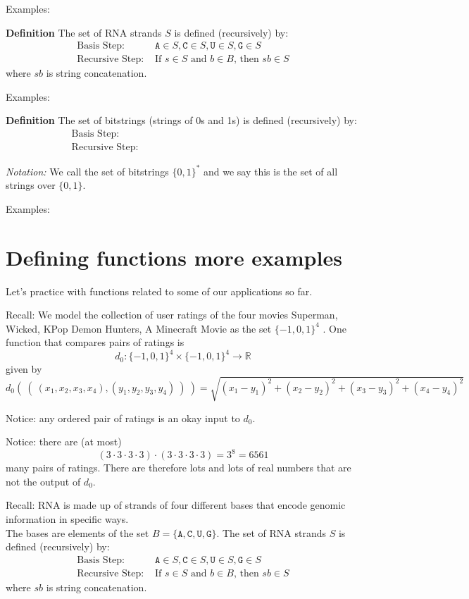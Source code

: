 \documentclass[12pt, oneside]{article}
\newcommand{\A}[0]{\texttt{A}}
\newcommand{\C}[0]{\texttt{C}}
\newcommand{\G}[0]{\texttt{G}}
\newcommand{\U}[0]{\texttt{U}}
\begin{document}
Examples: 

\vfill

{\bf Definition} The set of RNA strands $S$ is defined (recursively) by:
\[
\begin{array}{ll}
\textrm{Basis Step: } & \A \in S, \C \in S, \U \in S, \G \in S \\
\textrm{Recursive Step: } & \textrm{If } s \in S\textrm{ and }b \in B \textrm{, then }sb \in S
\end{array}
\]
where $sb$ is string concatenation.

Examples: 

\vfill

{\bf Definition} The set of bitstrings (strings of 0s and 1s) is defined (recursively) by:
\[
\begin{array}{ll}
\textrm{Basis Step: } & \phantom{\lambda \in X} \\
\textrm{Recursive Step: } & \phantom{\textrm{If } s \in X \textrm{, then } s0 \in X \text{ and } s1 \in X}
\end{array}
\]

{\it Notation:} We call the set of bitstrings $\{0,1\}^*$ and we say 
this is the set of all strings over $\{0,1\}$.

Examples: 

\vfill \vfill
\section*{Defining functions more examples}


Let's practice with functions related to some of our applications so far.

Recall: We model the collection of user ratings of the four movies Superman, Wicked, KPop Demon Hunters, A Minecraft Movie as the set
$\{-1,0,1\}^4$ . One function that compares pairs of ratings is
$$d_0: \{-1,0,1\}^4 \times \{-1,0,1\}^4 \to \mathbb{R}$$
given by
\[
d_0 (~(~ (x_1, x_2, x_3, x_4), (y_1, y_2, y_3, y_4) ~) ~) = \sqrt{ (x_1 - y_1)^2 + (x_2 - y_2)^2 + (x_3 -y_3)^2 + (x_4 -y_4)^2}
\]

Notice: any ordered pair of ratings is an okay input to $d_0$.

Notice: there are (at most) 
\[
(3 \cdot 3 \cdot 3 \cdot 3)\cdot (3 \cdot 3 \cdot 3 \cdot 3) = 3^8 = 6561
\]
many pairs of ratings. There are therefore lots and lots of real numbers that are not the output of $d_0$.

\vfill

Recall: RNA is made up of strands of four different bases that encode genomic information
in specific ways.\\
The bases are elements of the set 
$B  = \{\A, \C, \U, \G \}$. The set of RNA strands $S$ is defined (recursively) by:
\[
\begin{array}{ll}
\textrm{Basis Step: } & \A \in S, \C \in S, \U \in S, \G \in S \\
\textrm{Recursive Step: } & \textrm{If } s \in S\textrm{ and }b \in B \textrm{, then }sb \in S
\end{array}
\]
where $sb$ is string concatenation.
\end{document}
